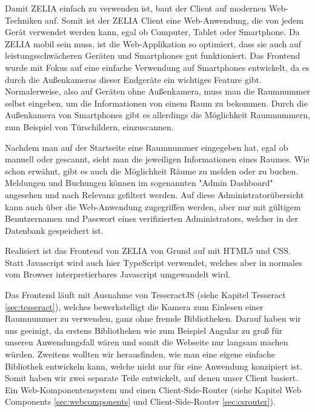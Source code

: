 
Damit ZELIA einfach zu verwenden ist, baut der Client auf modernen Web-Techniken auf. Somit ist der ZELIA Client eine Web-Anwendung,  die von jedem Gerät verwendet werden kann, egal ob Computer, Tablet oder Smartphone. Da ZELIA mobil sein muss, ist die Web-Applikation so optimiert, dass sie auch auf leistungsschwächeren Geräten und Smartphones gut funktioniert. Das Frontend wurde mit Fokus auf eine einfache Verwendung auf Smartphones entwickelt, da es durch die Außenkameras dieser Endgeräte ein wichtiges Feature gibt. Normalerweise, also auf Geräten ohne Außenkamera, muss man die Raumnummer selbst eingeben, um die Informationen von einem Raum zu bekommen. Durch die Außenkamera von Smartphones gibt es allerdings die Möglichkeit Raumnummern, zum Beispiel von Türschildern, einzuscannen. 

Nachdem man auf der Startseite eine Raumnummer eingegeben hat, egal ob manuell oder gescannt, sieht man die jeweiligen Informationen eines Raumes. Wie schon erwähnt, gibt es auch die Möglichkeit Räume zu melden oder zu buchen. Meldungen und Buchungen können im sogenannten "Admin Dashboard" angesehen und nach Relevanz gefiltert werden. Auf diese Administratorübersicht kann auch über die Web-Anwendung zugegriffen werden, aber nur mit gültigem Benutzernamen und Passwort eines verifizierten Administrators, welcher in der Datenbank gespeichert ist.

Realisiert ist das Frontend von ZELIA von Grund auf mit HTML5 und CSS. Statt Javascript wird auch hier TypeScript verwendet, welches aber in normales vom Browser interpretierbares Javascript umgewandelt wird. 

Das Frontend läuft mit Ausnahme von TesseractJS (siehe Kapitel Tesseract \ref{sec:tesseract}), welches bewerkstelligt die Kamera zum Einlesen einer Raumnummer zu verwenden, ganz ohne fremde Bibliotheken. Darauf haben wir uns geeinigt, da erstens Bibliotheken wie zum Beispiel Angular zu groß für unseren Anwendungsfall wären und somit die Webseite nur langsam machen würden. Zweitens wollten wir herausfinden, wie man eine eigene einfache Bibliothek entwickeln kann, welche nicht nur für eine Anwendung konzipiert ist. Somit haben wir zwei separate Teile entwickelt, auf denen unser Client basiert. Ein Web-Komponentensystem und einen Client-Side-Router (siehe Kapitel Web Components \ref{sec:webcomponents} und Client-Side-Router \ref{sec:csrouter}).